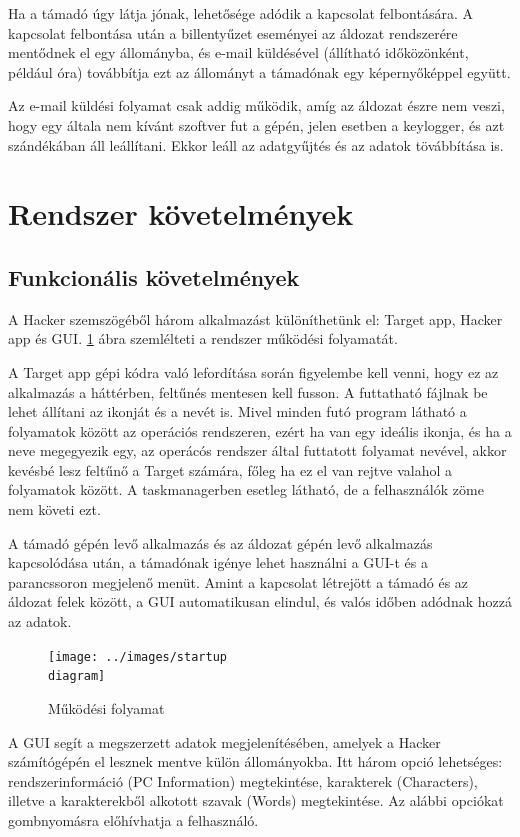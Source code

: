 \documentclass[12pt,a4paper,oneside]{report}
\begin{document}
Ha a támadó úgy látja jónak, lehetősége adódik a kapcsolat felbontására. A kapcsolat felbontása után a billentyűzet eseményei az áldozat rendszerére mentődnek el egy állományba, és e-mail küldésével (állítható időközönként, például óra) továbbítja ezt az állományt a támadónak egy képernyőképpel együtt.

Az e-mail küldési folyamat csak addig működik, amíg az áldozat észre nem veszi, hogy egy általa nem kívánt szoftver fut a gépén, jelen esetben a keylogger, és azt szándékában áll leállítani. Ekkor leáll az adatgyűjtés és az adatok tövábbítása is.

\section{Rendszer követelmények}
\subsection{Funkcionális követelmények} %
A Hacker szemszögéből három alkalmazást különíthetünk el: Target app, Hacker app és GUI. \ref{fig:startupdia} ábra szemlélteti a rendszer működési folyamatát.

A Target app gépi kódra való lefordítása során figyelembe kell venni, hogy ez az alkalmazás a háttérben, feltűnés mentesen kell fusson. A futtatható fájlnak be lehet állítani az ikonját és a nevét is. Mivel minden futó program látható a folyamatok között az operációs rendszeren, ezért ha van egy ideális ikonja, és ha a neve megegyezik egy, az operácós rendszer által futtatott folyamat nevével, akkor kevésbé lesz feltűnő a Target számára, főleg ha ez el van rejtve valahol a folyamatok között. A taskmanagerben esetleg látható, de a felhasználók zöme nem követi ezt.

A támadó gépén levő alkalmazás és az áldozat gépén levő alkalmazás kapcsolódása után, a támadónak igénye lehet használni a GUI-t és a parancssoron megjelenő menüt. Amint a kapcsolat létrejött a támadó és az áldozat felek között, a GUI automatikusan elindul, és valós időben adódnak hozzá az adatok.
\begin{figure}[H]
\centering
\texttt{[image: ../images/startup\\ diagram]}
\caption{Működési folyamat}
\label{fig:startupdia}
\end{figure}

A GUI segít a megszerzett adatok megjelenítésében, amelyek a Hacker számítógépén el lesznek mentve külön állományokba. Itt három opció lehetséges: rendszerinformáció (PC Information) megtekintése, karakterek (Characters), illetve a karakterekből alkotott szavak (Words) megtekintése. Az alábbi opciókat gombnyomásra előhívhatja a felhasználó.
\end{document}
